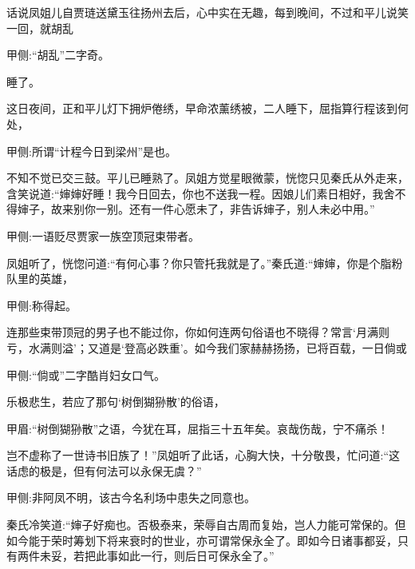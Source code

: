 \begin{parag}
    话说凤姐儿自贾琏送黛玉往扬州去后，心中实在无趣，每到晚间，不过和平儿说笑一回，就胡乱\begin{note}甲侧:“胡乱”二字奇。\end{note}睡了。
\end{parag}


\begin{parag}
    这日夜间，正和平儿灯下拥炉倦绣，早命浓薰绣被，二人睡下，屈指算行程该到何处，\begin{note}甲侧:所谓“计程今日到梁州”是也。\end{note}不知不觉已交三鼓。平儿已睡熟了。凤姐方觉星眼微蒙，恍惚只见秦氏从外走来，含笑说道:“婶婶好睡！我今日回去，你也不送我一程。因娘儿们素日相好，我舍不得婶子，故来别你一别。还有一件心愿未了，非告诉婶子，别人未必中用。”\begin{note}甲侧:一语贬尽贾家一族空顶冠束带者。\end{note}
\end{parag}


\begin{parag}
    凤姐听了，恍惚问道:“有何心事？你只管托我就是了。”秦氏道:“婶婶，你是个脂粉队里的英雄，\begin{note}甲侧:称得起。\end{note}连那些束带顶冠的男子也不能过你，你如何连两句俗语也不晓得？常言‘月满则亏，水满则溢’；又道是‘登高必跌重’。如今我们家赫赫扬扬，已将百载，一日倘或\begin{note}甲侧:“倘或”二字酷肖妇女口气。\end{note}乐极悲生，若应了那句‘树倒猢狲散’的俗语，\begin{note}甲眉:“树倒猢狲散”之语，今犹在耳，屈指三十五年矣。哀哉伤哉，宁不痛杀！\end{note}岂不虚称了一世诗书旧族了！”凤姐听了此话，心胸大快，十分敬畏，忙问道:“这话虑的极是，但有何法可以永保无虞？”\begin{note}甲侧:非阿凤不明，该古今名利场中患失之同意也。\end{note}秦氏冷笑道:“婶子好痴也。否极泰来，荣辱自古周而复始，岂人力能可常保的。但如今能于荣时筹划下将来衰时的世业，亦可谓常保永全了。即如今日诸事都妥，只有两件未妥，若把此事如此一行，则后日可保永全了。”
\end{parag}



